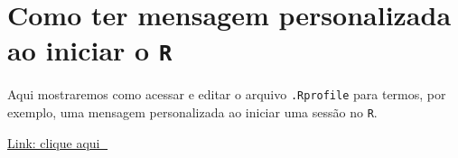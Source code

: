 \documentclass[
  12pt,
  brazilian,
]{book}
\begin{document}
\hypertarget{como-ter-mensagem-personalizada-ao-iniciar-o-r}{%
\chapter{\texorpdfstring{Como ter mensagem personalizada ao iniciar o \texttt{R}}{Como ter mensagem personalizada ao iniciar o R}}\label{como-ter-mensagem-personalizada-ao-iniciar-o-r}}

Aqui mostraremos como acessar e editar o arquivo \texttt{.Rprofile} para termos, por exemplo, uma mensagem personalizada ao iniciar uma sessão no \texttt{R}.

\href{https://stackoverflow.com/questions/46819684/how-to-access-and-edit-rprofile}{Link: clique aqui 🔗}

\hypertarget{section}{%
\chapter{}\label{section}}

  
\end{document}
